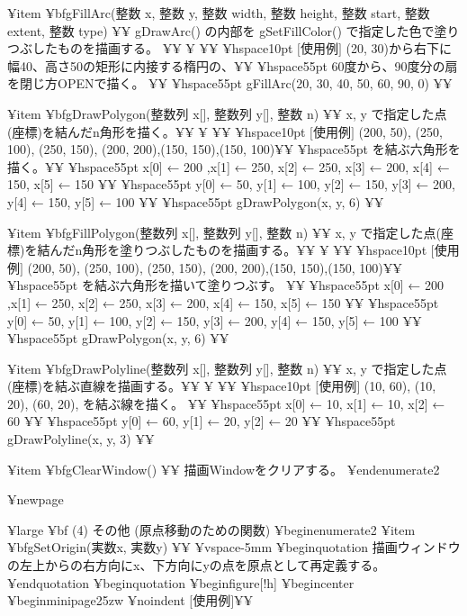 ¥item {¥bf{gFillArc(整数 x, 整数 y, 整数 width, 整数 height, 整数 start, 整数 extent, 整数 type)}} ¥¥
       gDrawArc() の内部を gSetFillColor() で指定した色で塗りつぶしたものを描画する。 ¥¥
¥ ¥¥
	  ¥hspace{10pt}  $[$使用例$]$ (20, 30)から右下に幅40、高さ50の矩形に内接する楕円の、¥¥
          ¥hspace{55pt} 60度から、90度分の扇を閉じ方OPENで描く。 ¥¥
          ¥hspace{55pt}    gFillArc(20, 30, 40, 50, 60, 90, 0) ¥¥

¥item {¥bf{gDrawPolygon(整数列 x[], 整数列 y[], 整数 n)}} ¥¥
       x, y で指定した点(座標)を結んだn角形を描く。¥¥
¥ ¥¥
	  ¥hspace{10pt}  $[$使用例$]$ (200, 50), (250, 100), (250, 150), (200, 200),(150, 150),(150, 100)¥¥
          ¥hspace{55pt}  を結ぶ六角形を描く。¥¥
          ¥hspace{55pt}    x[0] ← 200 ,x[1] ← 250, x[2] ← 250, x[3] ← 200, x[4] ← 150, x[5] ← 150 ¥¥
          ¥hspace{55pt}    y[0] ← 50, y[1] ← 100, y[2] ← 150, y[3] ← 200, y[4] ← 150, y[5] ← 100 ¥¥ 
          ¥hspace{55pt}    gDrawPolygon(x, y, 6) ¥¥

¥item {¥bf{gFillPolygon(整数列 x[], 整数列 y[], 整数 n)}} ¥¥
       x, y で指定した点(座標)を結んだn角形を塗りつぶしたものを描画する。¥¥
¥ ¥¥
	  ¥hspace{10pt}  $[$使用例$]$ (200, 50), (250, 100), (250, 150), (200, 200),(150, 150),(150, 100)¥¥
          ¥hspace{55pt}  を結ぶ六角形を描いて塗りつぶす。 ¥¥
          ¥hspace{55pt}    x[0] ← 200 ,x[1] ← 250, x[2] ← 250, x[3] ← 200, x[4] ← 150, x[5] ← 150 ¥¥
          ¥hspace{55pt}    y[0] ← 50, y[1] ← 100, y[2] ← 150, y[3] ← 200, y[4] ← 150, y[5] ← 100 ¥¥ 
          ¥hspace{55pt}    gDrawPolygon(x, y, 6) ¥¥

¥item {¥bf{gDrawPolyline(整数列 x[], 整数列 y[], 整数 n)}} ¥¥
       x, y で指定した点(座標)を結ぶ直線を描画する。¥¥
¥ ¥¥
	  ¥hspace{10pt}  $[$使用例$]$ (10, 60), (10, 20), (60, 20), を結ぶ線を描く。 ¥¥
          ¥hspace{55pt}    x[0] ← 10, x[1] ← 10, x[2] ← 60 ¥¥
          ¥hspace{55pt}    y[0] ← 60, y[1] ← 20, y[2] ← 20 ¥¥
          ¥hspace{55pt}    gDrawPolyline(x, y, 3) ¥¥


¥item {¥bf{gClearWindow()}} ¥¥
       描画Windowをクリアする。
¥end{enumerate2}

¥newpage

{¥large{
{¥bf{
(4) その他 (原点移動のための関数)
}}
}}
¥begin{enumerate2}
¥item {¥bf{gSetOrigin(実数x, 実数y)}} ¥¥
¥vspace{-5mm}
   ¥begin{quotation}
     描画ウィンドウの左上からの右方向にx、下方向にyの点を原点として再定義する。
   ¥end{quotation}
   ¥begin{quotation}
¥begin{figure}[!h]
¥begin{center}
¥begin{minipage}{25zw}
	   ¥noindent $[$使用例$]$¥¥


